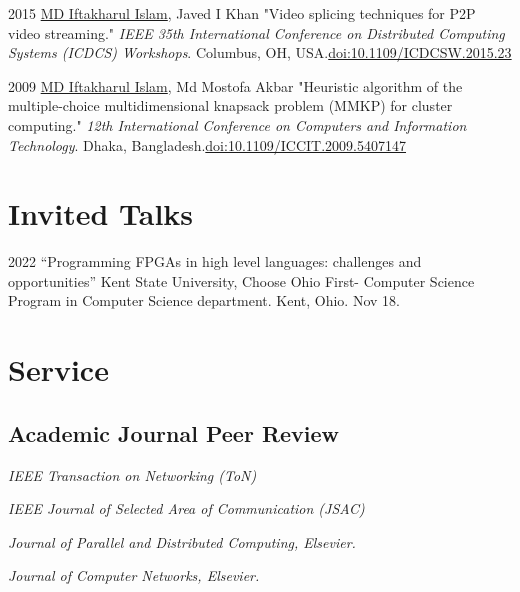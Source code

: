 \documentclass[11pt,letterpaper]{report}
\newcommand{\listitemspace}{0.25em}
\renewenvironment{itemize}
{\begin{list}{}{\setlength{\leftmargin}{0em}
                \setlength{\parskip}{0em}
                \setlength{\itemsep}{\listitemspace}
                \setlength{\parsep}{\listitemspace}}}
{\end{list}}
\begin{document}
\begin{tablist}
        \item[2015] \tab{}\underline{MD Iftakharul Islam}, Javed I Khan "Video splicing techniques for P2P video streaming." \textit{IEEE 35th International Conference on Distributed Computing Systems (ICDCS) Workshops}. Columbus, OH, USA.\@ \href{https://ieeexplore.ieee.org/document/7165086}{doi:10.1109/ICDCSW.2015.23}

        \item[2009] \tab{}\underline{MD Iftakharul Islam}, Md Mostofa Akbar "Heuristic algorithm of the multiple-choice multidimensional knapsack problem (MMKP) for cluster computing." \textit{12th International Conference on Computers and Information Technology}. Dhaka, Bangladesh.\@ \href{https://ieeexplore.ieee.org/document/5407147}{doi:10.1109/ICCIT.2009.5407147}
        
    \end{tablist}




    \section*{Invited Talks}

    \begin{tablist}

        \item[2022] \tab{}\enquote{Programming FPGAs in high level languages: challenges and opportunities} Kent State University, Choose Ohio First- Computer Science Program in Computer Science department. Kent, Ohio. Nov 18.


    \end{tablist}

    \section*{Service}


    \subsection*{Academic Journal Peer Review}

    \begin{itemize}
        \item \textit{IEEE Transaction on Networking (ToN)}
        \item \textit{IEEE Journal of Selected Area of Communication (JSAC)}
        \item \textit{Journal of Parallel and Distributed Computing, Elsevier.}
        \item \textit{Journal of Computer Networks, Elsevier.}
    \end{itemize}
\end{document}
